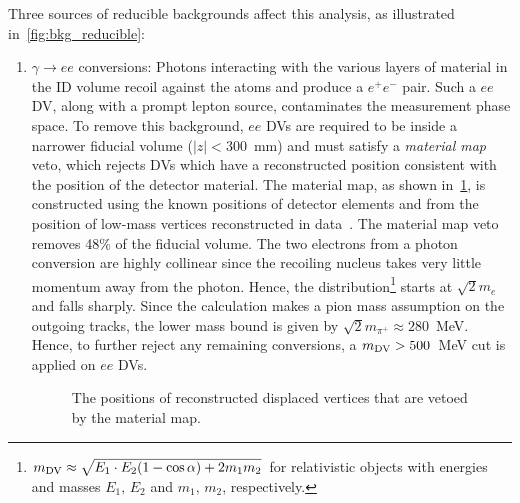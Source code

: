 Three sources of reducible backgrounds affect this analysis, as illustrated in~\cref{fig:bkg_reducible}:
\begin{enumerate}
    \item $\gamma\to ee$ conversions: Photons interacting with the various layers of material in the ID volume recoil against the atoms and produce a $e^+e^-$ pair. Such a $ee$ DV, along with a prompt lepton source, contaminates the measurement phase space. To remove this background, $ee$ DVs are required to be inside a narrower fiducial volume ($|z|<300$~mm) and must satisfy a \textit{material map} veto, which rejects DVs which have a reconstructed position consistent with the position of the detector material. The material map, as shown in~\cref{fig:material_map}, is constructed using the known positions of detector elements and from the position of low-mass vertices reconstructed in data~\cite{SUSY-2018-13}. The material map veto removes 48\% of the fiducial volume. The two electrons from a photon conversion are highly collinear since the recoiling nucleus takes very little momentum away from the photon. Hence, the \mdv distribution\footnote{$m_{\mathrm{DV}}\approx\sqrt{E_1\cdot E_2 (1-\cos\alpha)+2m_1m_2}$ for relativistic objects with energies and masses $E_1,\,E_2$ and $m_1,\,m_2$, respectively.} starts at $\sqrt{2}m_e$ and falls sharply. Since the \mdv calculation makes a pion mass assumption on the outgoing tracks, the lower mass bound is given by $\sqrt{2}m_{\pi^+}\approx280$~MeV. Hence, to further reject any remaining conversions, a $m_{\mathrm{DV}}>500$~MeV cut is applied on $ee$ DVs.

    \begin{figure}[!ht]
        \centering
        \caption{The positions of reconstructed displaced vertices that are vetoed by the material map.~\cite{SUSY-2018-13}}
        \label{fig:material_map}
    \end{figure}


\end{enumerate}
